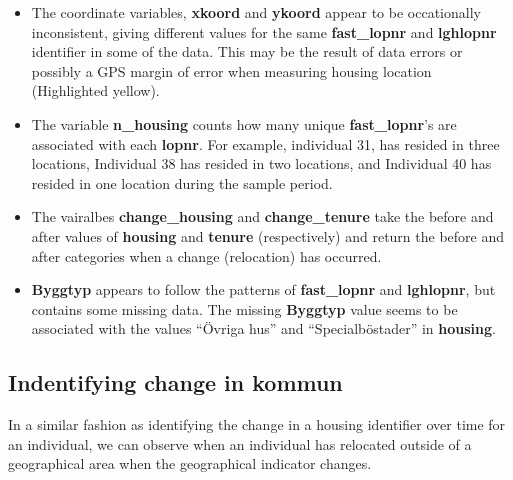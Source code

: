 \documentclass[
]{book}
\begin{document}
\begin{itemize}
\item
  The coordinate variables, \textbf{xkoord} and \textbf{ykoord} appear to be occationally inconsistent, giving different values for the same \textbf{fast\_lopnr} and \textbf{lghlopnr} identifier in some of the data. This may be the result of data errors or possibly a GPS margin of error when measuring housing location (Highlighted yellow).
\item
  The variable \textbf{n\_housing} counts how many unique \textbf{fast\_lopnr}'s are associated with each \textbf{lopnr}. For example, individual 31, has resided in three locations, Individual 38 has resided in two locations, and Individual 40 has resided in one location during the sample period.
\item
  The vairalbes \textbf{change\_housing} and \textbf{change\_tenure} take the before and after values of \textbf{housing} and \textbf{tenure} (respectively) and return the before and after categories when a change (relocation) has occurred.
\item
  \textbf{Byggtyp} appears to follow the patterns of \textbf{fast\_lopnr} and \textbf{lghlopnr}, but contains some missing data. The missing \textbf{Byggtyp} value seems to be associated with the values ``Övriga hus'' and ``Specialböstader'' in \textbf{housing}.
\end{itemize}

\hypertarget{indentifying-change-in-kommun}{%
\subsection{Indentifying change in kommun}\label{indentifying-change-in-kommun}}

In a similar fashion as identifying the change in a housing identifier over time for an individual, we can observe when an individual has relocated outside of a geographical area when the geographical indicator changes.
\end{document}
